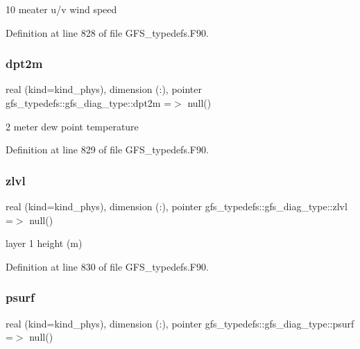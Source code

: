 10 meater u/v wind speed 



Definition at line 828 of file G\+F\+S\+\_\+typedefs.\+F90.

\mbox{\label{structgfs__typedefs_1_1gfs__diag__type_a6a9b82fea02afe9a3da91e00f249a3d3}} 
\subsubsection{dpt2m}
{\footnotesize\ttfamily real (kind=kind\+\_\+phys), dimension  (\+:), pointer gfs\+\_\+typedefs\+::gfs\+\_\+diag\+\_\+type\+::dpt2m =$>$ null()}



2 meter dew point temperature 



Definition at line 829 of file G\+F\+S\+\_\+typedefs.\+F90.

\mbox{\label{structgfs__typedefs_1_1gfs__diag__type_a53a74076f06c4b0cfb66cb815da7f4ca}} 
\subsubsection{zlvl}
{\footnotesize\ttfamily real (kind=kind\+\_\+phys), dimension   (\+:), pointer gfs\+\_\+typedefs\+::gfs\+\_\+diag\+\_\+type\+::zlvl =$>$ null()}



layer 1 height (m) 



Definition at line 830 of file G\+F\+S\+\_\+typedefs.\+F90.

\mbox{\label{structgfs__typedefs_1_1gfs__diag__type_a812f293fc452371d886830edd7f5c314}} 
\subsubsection{psurf}
{\footnotesize\ttfamily real (kind=kind\+\_\+phys), dimension  (\+:), pointer gfs\+\_\+typedefs\+::gfs\+\_\+diag\+\_\+type\+::psurf =$>$ null()}



